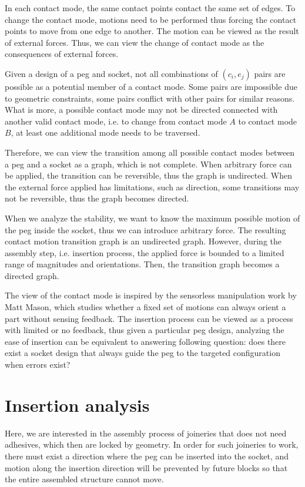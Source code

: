 \documentclass[11p]{article}
\begin{document}
In each contact mode, the same contact points contact the same set of edges. To change the contact mode, motions need to be performed thus forcing the contact points to move from one edge to another. The motion can be viewed as the result of external forces. Thus, we can view the change of contact mode as the consequences of external forces. 


Given a design of a peg and socket, not all combinations of $(c_i, e_j)$ pairs are possible as a potential member of a contact mode. Some pairs are impossible due to geometric constraints, some pairs conflict with other pairs for similar reasons. What is more, a possible contact mode may not be directed connected with another valid contact mode, i.e. to change from contact mode $A$ to contact mode $B$, at least one additional mode needs to be traversed. 

Therefore, we can view the transition among all possible contact modes between a peg and a socket as a graph, which is not complete. When arbitrary force can be applied, the transition can be reversible, thus the graph is undirected. When the external force applied has limitations, such as direction, some transitions may not be reversible, thus the graph becomes directed. 

When we analyze the stability, we want to know the maximum possible motion of the peg inside the socket, thus we can introduce arbitrary force. The resulting contact motion transition graph is an undirected graph. However, during the assembly step, i.e. insertion process, the applied force is bounded to a limited range of magnitudes and orientations. Then, the transition graph becomes a directed graph. 

The view of the contact mode is inspired by the sensorless manipulation work by Matt Mason, which studies whether a fixed set of motions can always orient a part without sensing feedback. The insertion process can be viewed as a process with limited or no feedback, thus given a particular peg design, analyzing the ease of insertion can be equivalent to answering following question: does there exist a socket design that always guide the peg to the targeted configuration when errors exist? 



\section{Insertion analysis}

Here, we are interested in the assembly process of joineries that does not need adhesives, which then are locked by geometry. In order for such joineries to work, there must exist a direction where the peg can be inserted into the socket, and motion along the insertion direction will be prevented by future blocks so that the entire assembled structure cannot move. 
\end{document}
